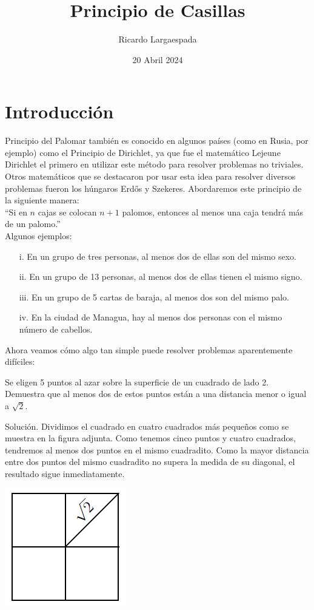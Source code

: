 \documentclass[11pt]{scrartcl}
\begin{document}
\title{Principio de Casillas}
\author{Ricardo Largaespada}
\date{20 Abril 2024}

\maketitle
\section{Introducción}
Principio del Palomar también es conocido en algunos países (como en Rusia, por ejemplo) como el Principio de Dirichlet, ya que fue el matemático Lejeune Dirichlet el primero en utilizar este método para resolver problemas no triviales. Otros matemáticos que se destacaron por usar esta idea para resolver diversos problemas fueron los húngaros Erdős y Szekeres. Abordaremos este principio de la siguiente manera:\\

``Si en $n$ cajas se colocan $n + 1$ palomos, entonces al menos una caja tendrá más de un palomo.''\\

Algunos ejemplos:\begin{itemize}
\item[i.] En un grupo de tres personas, al menos dos de ellas son del mismo sexo.
\item[ii.] En un grupo de 13 personas, al menos dos de ellas tienen el mismo signo.
\item[iii.] En un grupo de 5 cartas de baraja, al menos dos son del mismo palo.
\item[iv.] En la ciudad de Managua, hay al menos dos personas con el mismo número de cabellos.
\end{itemize}
Ahora veamos cómo algo tan simple puede resolver problemas aparentemente difíciles:

\begin{example}
Se eligen 5 puntos al azar sobre la superficie de un cuadrado de lado 2. Demuestra que al menos dos de estos puntos están a una distancia menor o igual a $\sqrt2$.
\end{example}
Solución. Dividimos el cuadrado en cuatro cuadrados más pequeños como se muestra en la figura adjunta. Como tenemos cinco puntos y cuatro cuadrados, tendremos al menos dos puntos en el mismo cuadradito. Como la mayor distancia entre dos puntos del mismo cuadradito no supera la medida de su diagonal, el resultado sigue inmediatamente.

\begin{center}
    \includegraphics[scale=1]{images/clase_07_sqrt2.png}
\end{center}
\end{document}
